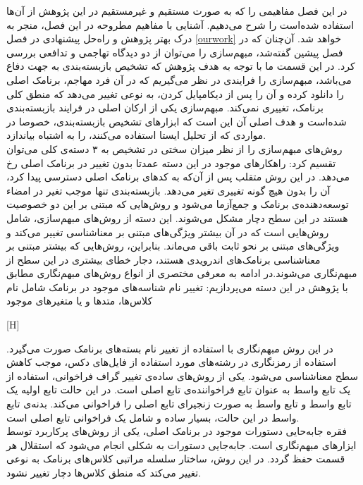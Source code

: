 
\label{premliminaries}
در این فصل مفاهیمی را که به صورت مستقیم و غیرمستقیم در این پژوهش از آن‌ها استفاده شده‌است را شرح ‌می‌دهیم. آشنایی با مفاهیم مطروحه در این فصل، منجر به درک بهتر پژوهش و راه‌حل پیشنهادی در فصل 
\ref{ourwork}
خواهد شد.
آن‌چنان که در فصل پیشین گفته‌شد، مبهم‌سازی را می‌توان از دو دیدگاه تهاجمی و تدافعی بررسی کرد. در این قسمت ما با توجه به هدف پژوهش که تشخیص بازبسته‌بندی به جهت دفاع می‌باشد، مبهم‌سازی را فرایندی در نظر می‌گیریم که در آن فرد مهاجم، برنامک اصلی را دانلود کرده و آن را پس از دیکامپایل کردن، به نوعی تغییر می‌دهد که منطق کلی برنامک، تغییری نمی‌کند. مبهم‌سازی یکی از ارکان اصلی در فرایند بازبسته‌بندی شده‌است و هدف اصلی آن این است که ابزار‌های تشخیص بازبسته‌بندی، خصوصا در مواردی که از تحلیل ایستا استفاده می‌کنند، را به اشتباه بیاندازد.
\\
روش‌های مبهم‌سازی را از نظر میزان سختی در تشخیص به ۳ دسته‌ی کلی می‌توان تقسیم کرد: 
راهکار‌های موجود در این دسته عمدتا بدون تغییر در برنامک اصلی رخ می‌دهد. در این روش متقلب پس از آن‌که به کد‌های برنامک اصلی دسترسی پیدا کرد، آن را بدون هیچ گونه تغییری تغیر می‌دهد. بازبسته‌بندی تنها موجب تغیر در امضا‌ء توسعه‌دهنده‌ی برنامک  و جمع‌آزما می‌شود و روش‌هایی که مبتنی بر این دو خصوصیت هستند در این سطح دچار مشکل می‌شوند.
\label{miani}
این دسته از روش‌های مبهم‌سازی، شامل روش‌هایی است که در آن بیشتر ویژگی‌های مبتنی بر معناشناسی تغییر می‌کند و ویژگی‌های مبتنی بر نحو ثابت باقی می‌ماند. بنابراین، روش‌هایی که بیشتر مبتنی بر معنا‌شناسی برنامک‌های اندرویدی هستند، دجار خطای بیشتری در این سطح از مبهم‌نگاری می‌شوند.در ادامه به معرفی مختصری از انواع روش‌های مبهم‌نگاری مطابق با پژوهش  ‌ در این دسته می‌پردازیم:
  تغییر نام شناسه‌های موجود در برنامک شامل نام کلاس‌ها، متد‌ها و یا متغیر‌های موجود 


[H]
\vspace{1em}

  در این روش مبهم‌نگاری با استفاده از تغییر نام بسته‌های برنامک صورت می‌گیرد.
  استفاده از رمز‌نگاری در رشته‌های مورد استفاده از فایل‌های دکس، موجب کاهش سطح معناشناسی می‌شود. 
  یکی از روش‌های ساده‌ی تغییر گراف فراخوانی، استفاده از یک تابع واسط به عنوان تابع فراخواننده‌ی تابع اصلی است. در این حالت تابع اولیه یک تابع واسط و تابع واسط به صورت زنجیر‌ای تابع اصلی را فراخوانی می‌کند. بدنه‌ی تابع واسط در این حالت، بسیار ساده و شامل یک فراخوانی تابع اصلی‌ است.
\\فقره  جابه‌حایی دستورات موجود در برنامک اصلی، یکی از روش‌های پرکاربرد توسط ایزار‌های مبهم‌نگاری است. جابه‌جایی دستورات به شکلی انجام می‌شود که استقلال هر قسمت حفظ گردد.
  در این روش، ساختار سلسله مراتبی کلاس‌های برنامک به نوعی تغییر می‌کتد که منطق کلاس‌ها دچار تغییر نشود.


